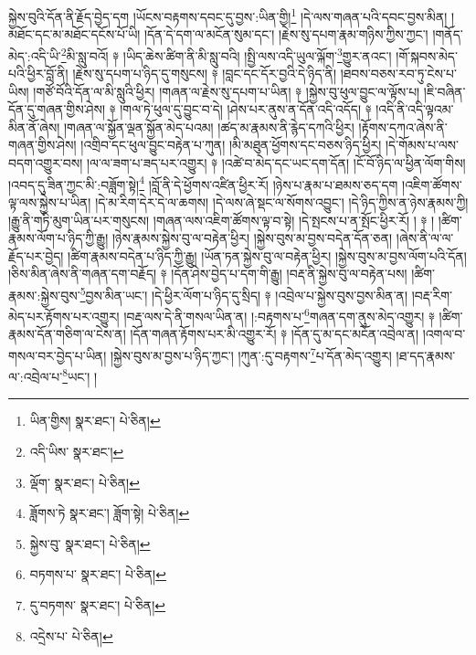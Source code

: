 སྐྱེས་བུའི་དོན་ནི་རྗོད་བྱེད་དག །ཡོངས་བརྟགས་དབང་དུ་བྱས་:ཡིན་གྱི།\footnote{ཡིན་གྱིས།  སྣར་ཐང་།  པེ་ཅིན། } །དེ་ལས་གཞན་པའི་དབང་བྱས་མིན། །མཐོང་དང་མ་མཐོང་དངོས་པོ་ཡི། །དོན་དེ་དག་ལ་མངོན་སུམ་དང་། །རྗེས་སུ་དཔག་རྣམ་གཉིས་ཀྱིས་ཀྱང་། །གནོད་མེད་:འདི་ཡི་\footnote{འདི་ཡིས་  སྣར་ཐང་། }མི་སླུ་བའོ། ༈ །ཡིད་ཆེས་ཚིག་ནི་མི་སླུ་བའི། །སྤྱི་ལས་འདི་ཡུལ་ལྐོག་\footnote{ལྡོག་  སྣར་ཐང་།  པེ་ཅིན། }གྱུར་ནའང་། །གོ་སྐབས་མེད་པའི་ཕྱིར་བློ་ནི། །རྗེས་སུ་དཔག་པ་ཉིད་དུ་གསུངས། ༈ །བླང་དང་དོར་བྱའི་དེ་ཉིད་ནི། །ཐབས་བཅས་རབ་ཏུ་ངེས་པ་ཡིས། །གཙོ་བོའི་དོན་ལ་མི་སླུའི་ཕྱིར། །གཞན་ལ་རྗེས་སུ་དཔག་པ་ཡིན། ༈ །སྐྱེས་བུ་ཕུལ་བྱུང་ལ་ལྟོས་པ། །ཇི་བཞིན་དོན་དུ་གཞན་གྱིས་ཤེས། ༈ །གལ་ཏེ་ཕུལ་དུ་བྱུང་བ་དེ། །ཤེས་པར་ནུས་ན་དོན་འདི་འདོད། ༈ །འདི་ནི་འདི་ལྟའམ་མིན་ནོ་ཞེས། །གཞན་ལ་སྐྱོན་ལྡན་སྐྱོན་མེད་པའམ། །ཚད་མ་རྣམས་ནི་རྙེད་དཀའི་ཕྱིར། །རྟོགས་དཀའ་ཞེས་ནི་གཞན་གྱིས་ཤེས། །འགྲིབ་དང་ཕུལ་བྱུང་བརྟེན་པ་ཀུན། །མི་མཐུན་ཕྱོགས་དང་བཅས་ཉིད་ཕྱིར། །དེ་གོམས་པ་ལས་བདག་འགྱུར་བས། །ལ་ལ་ཟག་པ་ཟད་པར་འགྱུར། ༈ །འཚེ་བ་མེད་དང་ཡང་དག་དོན། །ངོ་བོ་ཉིད་ལ་ཕྱིན་ལོག་གིས། །འབད་དུ་ཟིན་ཀྱང་མི་:བཟློག་སྟེ།\footnote{ཟློགས་ཏེ  སྣར་ཐང་། ཟློག་སྟེ།  པེ་ཅིན། } །བློ་ནི་དེ་ཕྱོགས་འཛིན་ཕྱིར་རོ། །ཉེས་པ་རྣམ་པ་ཐམས་ཅད་དག །འཇིག་ཚོགས་ལྟ་ལས་སྐྱེས་པ་ཡིན། །དེ་མ་རིག་དེར་དེ་ལ་ཆགས། །དེ་ལས་ཞེ་སྡང་ལ་སོགས་འབྱུང་། །དེ་ཉིད་ཀྱིས་ན་ཉེས་རྣམས་ཀྱི། །རྒྱུ་ནི་གཏི་མུག་ཡིན་པར་གསུངས། །གཞན་ལས་འཇིག་ཚོགས་ལྟ་བ་སྟེ། །དེ་སྤངས་པ་ན་སྤོང་ཕྱིར་རོ། ། ༈ ། །ཚིག་རྣམས་ལོག་པ་ཉིད་ཀྱི་རྒྱུ། །ཉེས་རྣམས་སྐྱེས་བུ་ལ་བརྟེན་ཕྱིར། །སྐྱེས་བུས་མ་བྱས་བདེན་དོན་ཅན། །ཞེས་ནི་ལ་ལ་རྗོད་པར་བྱེད། །ཚིག་རྣམས་བདེན་པ་ཉིད་ཀྱི་རྒྱུ། །ཡོན་ཏན་སྐྱེས་བུ་ལ་བརྟེན་ཕྱིར། །སྐྱེས་བུས་མ་བྱས་ལོག་པའི་དོན། །ཅིས་མིན་ཞེས་ནི་གཞན་དག་བརྗོད། ༈ །དོན་ཤེས་བྱེད་པ་དག་གི་རྒྱུ། །བརྡ་ནི་སྐྱེས་བུ་ལ་བརྟེན་པས། །ཚིག་རྣམས་:སྐྱེས་བུས་\footnote{སྐྱེས་བུ་  སྣར་ཐང་།  པེ་ཅིན། }བྱས་མིན་ཡང་། །དེ་ཕྱིར་ལོག་པ་ཉིད་དུ་སྲིད། ༈ །འབྲེལ་པ་སྐྱེས་བུས་བྱས་མིན་ན། །བརྡ་རིག་མེད་པར་རྟོགས་པར་འགྱུར། །བརྡ་ལས་དེ་ནི་གསལ་ཡིན་ན། །:བརྟགས་པ་\footnote{བཏགས་པ་  སྣར་ཐང་།  པེ་ཅིན། }གཞན་དག་ནུས་མེད་འགྱུར། ༈ །ཚིག་རྣམས་དོན་གཅིག་ལ་ངེས་ན། །དོན་གཞན་རྟོགས་པར་མི་འགྱུར་རོ། ༈ །དོན་དུ་མ་དང་མངོན་འབྲེལ་ན། །འགལ་བ་གསལ་བར་བྱེད་པ་ཡིན། །སྐྱེས་བུས་མ་བྱས་པ་ཉིད་ཀྱང་། །ཀུན་:དུ་བརྟགས་\footnote{དུ་བཏགས་  སྣར་ཐང་།  པེ་ཅིན། }པ་དོན་མེད་འགྱུར། །ཐ་དད་རྣམས་ལ་:འབྲེལ་པ་\footnote{འདྲེས་པ་  པེ་ཅིན། }ཡང་། །

